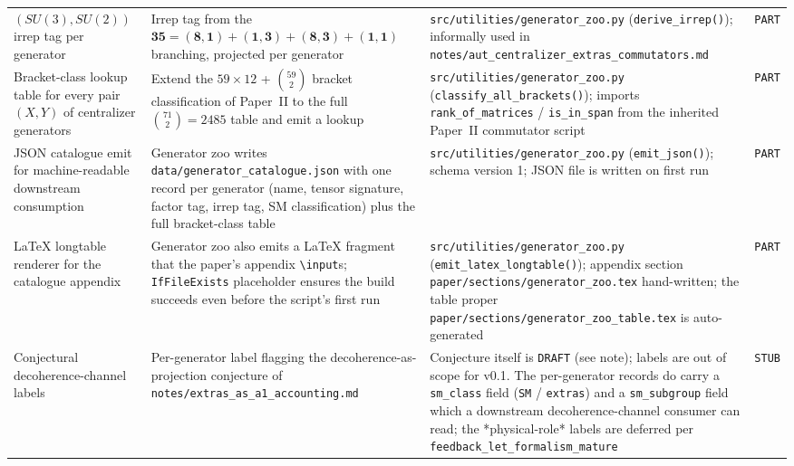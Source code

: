 {\begin{longtable}{@{}p{3.4cm}p{4.0cm}p{4.6cm}p{1.0cm}@{}}
$(SU(3), SU(2))$ irrep tag per generator
    & Irrep tag from the
      $\mathbf{35} = (\mathbf{8}, \mathbf{1}) + (\mathbf{1},
      \mathbf{3}) + (\mathbf{8}, \mathbf{3}) + (\mathbf{1},
      \mathbf{1})$ branching, projected per generator
    & \texttt{src/utilities/generator\_zoo.py}
      (\texttt{derive\_irrep()}); informally used in
      \texttt{notes/aut\_centralizer\_extras\_commutators.md}
    & \texttt{PART} \\

Bracket-class lookup table for every pair $(X, Y)$ of centralizer
generators
    & Extend the $59 \times 12$ + $\binom{59}{2}$ bracket
      classification of Paper~II to the full $\binom{71}{2} = 2485$
      table and emit a lookup
    & \texttt{src/utilities/generator\_zoo.py}
      (\texttt{classify\_all\_brackets()}); imports
      \texttt{rank\_of\_matrices} / \texttt{is\_in\_span} from the
      inherited Paper~II commutator script
    & \texttt{PART} \\

JSON catalogue emit for machine-readable downstream consumption
    & Generator zoo writes
      \texttt{data/generator\_catalogue.json} with one record per
      generator (name, tensor signature, factor tag, irrep tag,
      SM classification) plus the full bracket-class table
    & \texttt{src/utilities/generator\_zoo.py}
      (\texttt{emit\_json()}); schema version 1; JSON file is
      written on first run
    & \texttt{PART} \\

\LaTeX{} longtable renderer for the catalogue appendix
    & Generator zoo also emits a \LaTeX{} fragment that the paper's
      appendix \texttt{\textbackslash input}s; \texttt{IfFileExists}
      placeholder ensures the build succeeds even before the
      script's first run
    & \texttt{src/utilities/generator\_zoo.py}
      (\texttt{emit\_latex\_longtable()}); appendix section
      \texttt{paper/sections/generator\_zoo.tex} hand-written;
      the table proper \texttt{paper/sections/generator\_zoo\_table.tex}
      is auto-generated
    & \texttt{PART} \\

Conjectural decoherence-channel labels
    & Per-generator label flagging the
      decoherence-as-projection conjecture of
      \texttt{notes/extras\_as\_a1\_accounting.md}
    & Conjecture itself is \texttt{DRAFT} (see note); labels are
      out of scope for v0.1.  The per-generator records do carry
      a \texttt{sm\_class} field (\texttt{SM} / \texttt{extras})
      and a \texttt{sm\_subgroup} field which a downstream
      decoherence-channel consumer can read; the *physical-role*
      labels are deferred per \texttt{feedback\_let\_formalism\_mature}
    & \texttt{STUB} \\

\hline
\end{longtable}
}
